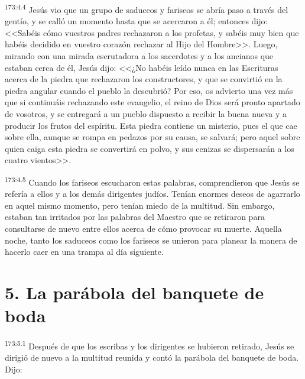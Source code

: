 \par 
\textsuperscript{173:4.4} Jesús vio que un grupo de saduceos y fariseos se abría paso a través del gentío, y se calló un momento hasta que se acercaron a él; entonces dijo: <<Sabéis cómo vuestros padres rechazaron a los profetas, y sabéis muy bien que habéis decidido en vuestro corazón rechazar al Hijo del Hombre>>. Luego, mirando con una mirada escrutadora a los sacerdotes y a los ancianos que estaban cerca de él, Jesús dijo: <<¿No habéis leído nunca en las Escrituras acerca de la piedra que rechazaron los constructores, y que se convirtió en la piedra angular cuando el pueblo la descubrió? Por eso, os advierto una vez más que si continuáis rechazando este evangelio, el reino de Dios será pronto apartado de vosotros, y se entregará a un pueblo dispuesto a recibir la buena nueva y a producir los frutos del espíritu. Esta piedra contiene un misterio, pues el que cae sobre ella, aunque se rompa en pedazos por su causa, se salvará; pero aquel sobre quien caiga esta piedra se convertirá en polvo, y sus cenizas se dispersarán a los cuatro vientos>>.

\par 
\textsuperscript{173:4.5} Cuando los fariseos escucharon estas palabras, comprendieron que Jesús se refería a ellos y a los demás dirigentes judíos. Tenían enormes deseos de agarrarlo en aquel mismo momento, pero tenían miedo de la multitud. Sin embargo, estaban tan irritados por las palabras del Maestro que se retiraron para consultarse de nuevo entre ellos acerca de cómo provocar su muerte. Aquella noche, tanto los saduceos como los fariseos se unieron para planear la manera de hacerlo caer en una trampa al día siguiente.

\section*{5. La parábola del banquete de boda}
\par 
\textsuperscript{173:5.1} Después de que los escribas y los dirigentes se hubieron retirado, Jesús se dirigió de nuevo a la multitud reunida y contó la parábola del banquete de boda. Dijo:

